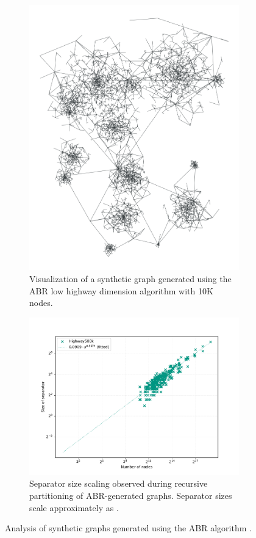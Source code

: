 \begin{figure}[tbhp]
    \centering
    \begin{subfigure}{0.35\linewidth}
        \centering
        \includegraphics[height=\linewidth, angle=90]{graphics/highway.png}
        \caption{Visualization of a synthetic graph generated using the ABR low highway dimension algorithm with 10K nodes.}
        \label{fig:abr_graph_viz}
    \end{subfigure}
    \hfill
    \begin{subfigure}{0.55\linewidth}
        \centering
        \includegraphics[width=\linewidth]{graphics/sep_highway.pdf}
        \caption{Separator size scaling observed during recursive partitioning of ABR-generated graphs. Separator sizes scale approximately as .}
        \label{fig:abr_graph_sep_plot}
    \end{subfigure}
    \caption{Analysis of synthetic graphs generated using the ABR algorithm \cite{abraham_highway_2010}.}
    \label{fig:abr_graph_separators}
\end{figure}

